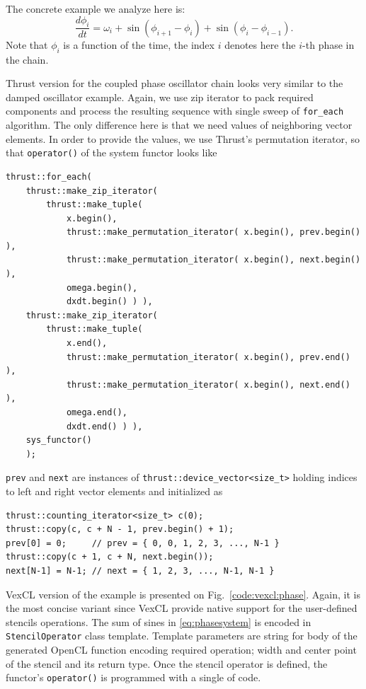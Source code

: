 \documentclass[1p]{elsarticle}
\newcommand{\code}[1]{\lstinline|#1|}
\newcommand{\figref}[1]{Fig.~\ref{#1}}
\begin{document}
The concrete example we analyze here is:
\begin{equation} \label{eq:phasesystem}
    \frac{d\phi_i}{dt} = \omega_i + \sin( \phi_{i+1} - \phi_i) + \sin( \phi_i
    - \phi_{i-1}).
\end{equation}
Note that $\phi_i$ is a function of the time, the index $i$ denotes here the
$i$-th phase in the chain.

Thrust version for the coupled phase oscillator chain looks very similar to the
damped oscillator example. Again, we use zip iterator to pack required
components and process the resulting sequence with single sweep of
\code{for_each} algorithm. The only difference here is that we need values of
neighboring vector elements. In order to provide the values, we use Thrust's
permutation iterator, so that \code{operator()} of the system functor looks
like
\begin{lstlisting}[frame=leftline]
thrust::for_each(
    thrust::make_zip_iterator(
        thrust::make_tuple(
            x.begin(),
            thrust::make_permutation_iterator( x.begin(), prev.begin() ),
            thrust::make_permutation_iterator( x.begin(), next.begin() ),
            omega.begin(),
            dxdt.begin() ) ),
    thrust::make_zip_iterator(
        thrust::make_tuple(
            x.end(),
            thrust::make_permutation_iterator( x.begin(), prev.end() ),
            thrust::make_permutation_iterator( x.begin(), next.end() ),
            omega.end(),
            dxdt.end() ) ),
    sys_functor()
    );
\end{lstlisting}
\code{prev} and \code{next} are instances of
\code{thrust::device_vector<size_t>} holding indices to left and right vector
elements and initialized as
\begin{lstlisting}[frame=leftline]
thrust::counting_iterator<size_t> c(0);
thrust::copy(c, c + N - 1, prev.begin() + 1);
prev[0] = 0;     // prev = { 0, 0, 1, 2, 3, ..., N-1 }
thrust::copy(c + 1, c + N, next.begin());
next[N-1] = N-1; // next = { 1, 2, 3, ..., N-1, N-1 }
\end{lstlisting}

VexCL version of the example is presented on \figref{code:vexcl:phase}. Again,
it is the most concise variant since VexCL provide native support for the
user-defined stencils operations. The sum of sines in \eqref{eq:phasesystem} is
encoded in \code{StencilOperator} class template. Template parameters are
string for body of the generated OpenCL function encoding required operation;
width and center point of the stencil and its return type. Once the stencil
operator is defined, the functor's \code{operator()} is programmed with a
single of code.
\end{document}
